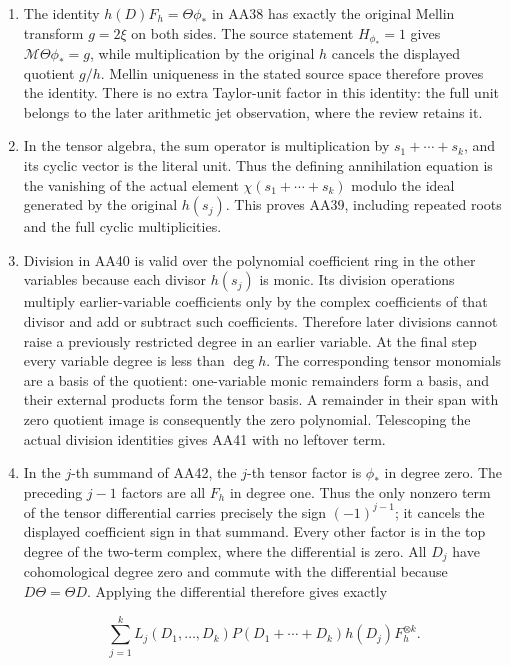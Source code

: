 \begin{enumerate}
\def\labelenumi{\arabic{enumi}.}
\item
  The identity \(h(D)F_h=\Theta\phi_*\) in AA38 has exactly the original Mellin transform \(g=2\xi\) on both sides. The source statement \(H_{\phi_*}=1\) gives \(\mathcal M\Theta\phi_*=g\), while multiplication by the original \(h\) cancels the displayed quotient \(g/h\). Mellin uniqueness in the stated source space therefore proves the identity. There is no extra Taylor-unit factor in this identity: the full unit belongs to the later arithmetic jet observation, where the review retains it.
\item
  In the tensor algebra, the sum operator is multiplication by \(s_1+\cdots+s_k\), and its cyclic vector is the literal unit. Thus the defining annihilation equation is the vanishing of the actual element \(\chi(s_1+\cdots+s_k)\) modulo the ideal generated by the original \(h(s_j)\). This proves AA39, including repeated roots and the full cyclic multiplicities.
\item
  Division in AA40 is valid over the polynomial coefficient ring in the other variables because each divisor \(h(s_j)\) is monic. Its division operations multiply earlier-variable coefficients only by the complex coefficients of that divisor and add or subtract such coefficients. Therefore later divisions cannot raise a previously restricted degree in an earlier variable. At the final step every variable degree is less than \(\deg h\). The corresponding tensor monomials are a basis of the quotient: one-variable monic remainders form a basis, and their external products form the tensor basis. A remainder in their span with zero quotient image is consequently the zero polynomial. Telescoping the actual division identities gives AA41 with no leftover term.
\item
  In the \(j\)-th summand of AA42, the \(j\)-th tensor factor is \(\phi_*\) in degree zero. The preceding \(j-1\) factors are all \(F_h\) in degree one. Thus the only nonzero term of the tensor differential carries precisely the sign \((-1)^{j-1}\); it cancels the displayed coefficient sign in that summand. Every other factor is in the top degree of the two-term complex, where the differential is zero. All \(D_j\) have cohomological degree zero and commute with the differential because \(D\Theta=\Theta D\). Applying the differential therefore gives exactly

  \[
\sum_{j=1}^k L_j(D_1,\ldots,D_k)
P(D_1+\cdots+D_k)h(D_j)F_h^{\otimes k}.
\]


\end{enumerate}
